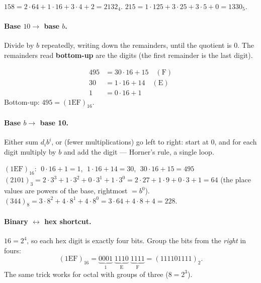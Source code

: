\documentclass{fkt-notes}
\theoremstyle{definition}
\begin{document}
\begin{example}
  $158=2\cdot64+1\cdot16+3\cdot4+2=2132_4$.\quad
  $215=1\cdot125+3\cdot25+3\cdot5+0=1330_5$.
\end{example}
\paragraph{Base $10 \to$ base $b$.} Divide by $b$ repeatedly, writing down
the remainders, until the quotient is $0$. The remainders read
\textbf{bottom-up} are the digits (the first remainder is the last digit).

\begin{example}[$495$ to hex]
  \begin{align*}
    495 & = 30 \cdot 16 + 15 \quad (\mathrm{F}) \\
    30  & = 1 \cdot 16 + 14 \quad (\mathrm{E})  \\
    1   & = 0 \cdot 16 + 1
  \end{align*}
  Bottom-up: $495 = (\mathrm{1EF})_{16}$.
\end{example}

\paragraph{Base $b \to$ base 10.} Either sum $d_i b^i$, or (fewer
multiplications) go left to right: start at $0$, and for each digit
multiply by $b$ and add the digit --- Horner's rule, a single loop.

\begin{example}
  $(\mathrm{1EF})_{16}$: $\;0 \cdot 16 + 1 = 1$, $\;1 \cdot 16 + 14 = 30$,
  $\;30 \cdot 16 + 15 = 495$ \checkmark\\
  $(2101)_3 = 2 \cdot 3^3 + 1 \cdot 3^2 + 0 \cdot 3^1 + 1 \cdot 3^0
  = 2 \cdot 27 + 1 \cdot 9 + 0 \cdot 3 + 1 = 64$ (the place values are
  powers of the base, rightmost $=b^0$).\\
  $(344)_8 = 3 \cdot 8^2 + 4 \cdot 8^1 + 4 \cdot 8^0
  = 3 \cdot 64 + 4 \cdot 8 + 4 = 228$.
\end{example}

\paragraph{Binary $\leftrightarrow$ hex shortcut.} $16 = 2^4$, so each hex
digit is exactly four bits. Group the bits from the \emph{right} in
fours:
\[
  (\mathrm{1EF})_{16} = \underbrace{0001}_{1}\;\underbrace{1110}_{\mathrm{E}}\;
  \underbrace{1111}_{\mathrm{F}} = (111101111)_2.
\]
The same trick works for octal with groups of three ($8 = 2^3$).
\end{document}
